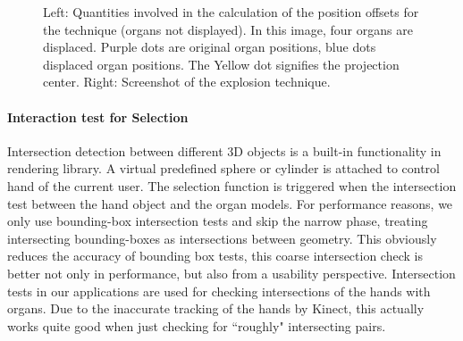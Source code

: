 \begin{figure}
	\caption[Organ Explosion]{Left: Quantities involved in the calculation of the position offsets for the technique (organs not displayed). In this image, four organs are displaced. Purple dots are original organ positions, blue dots displaced organ positions. The Yellow dot signifies the projection center. Right: Screenshot of the explosion technique.}
	\label{fig:3-IMR:organExplosion}
\end{figure}

\paragraph{Interaction test for Selection}
Intersection detection between different 3D objects is a built-in functionality in rendering library. A virtual predefined sphere or cylinder is attached to control hand of the current user. The selection function is triggered when the intersection test between the hand object and the organ models. 
For performance reasons, we only use bounding-box intersection tests and skip the narrow phase, treating intersecting bounding-boxes as intersections between geometry. This obviously reduces the accuracy of bounding box tests, this coarse intersection check is better not only in performance, but also from a usability perspective. Intersection tests in our applications are used for checking intersections of the hands with organs. Due to the inaccurate tracking of the hands by Kinect, this actually works quite good when just checking for ``roughly" intersecting pairs.

